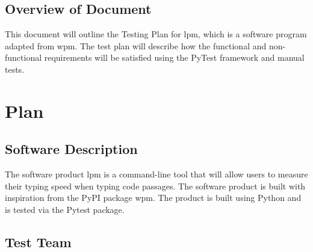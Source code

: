 \documentclass[12pt, titlepage]{article}
\begin{document}





\subsection{Overview of Document}

This document will outline the Testing Plan for lpm, which is a software program adapted from wpm. The test plan will describe how the functional and non-functional requirements will be satisfied using the PyTest framework and manual tests.

\section{Plan}

\subsection{Software Description}

The software product lpm is a command-line tool that will allow users to measure their typing speed when typing code passages. The software product is built with inspiration from the PyPI package wpm. The product is built using Python and is tested via the Pytest package.

\subsection{Test Team}
\end{document}
